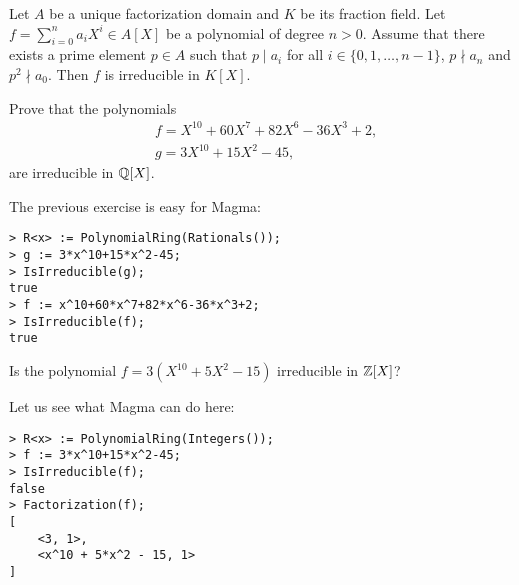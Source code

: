 \begin{bonus}
\label{bxca:Eisenstein's criterion}
    Let $A$ be a unique factorization domain and $K$ be its fraction field. 
    Let $f=\sum_{i=0}^n a_iX^i\in A[X]$ be a polynomial of degree $n>0$. 
    Assume that there exists a prime element $p\in A$ such that
    $p\mid a_i$ for all $i\in\{0,1,\dots,n-1\}$, $p\nmid a_n$ and
    $p^2\nmid a_0$. Then $f$ is irreducible in $K[X]$. 
\end{bonus}

\begin{exercise}
\label{xca: using Eisenstein}
    Prove that
    the polynomials 
    \begin{align*}
    &f=X^{10}+60X^7+82X^6-36X^3+2,\\
    &g=3X^{10}+15X^2-45, 
    \end{align*}
    are irreducible in $\mathbb{Q}[X]$. 
\end{exercise}

The previous exercise is easy for Magma:
\begin{lstlisting}
> R<x> := PolynomialRing(Rationals());
> g := 3*x^10+15*x^2-45;
> IsIrreducible(g);
true
> f := x^10+60*x^7+82*x^6-36*x^3+2;
> IsIrreducible(f);
true    
\end{lstlisting}

\begin{exercise}
\label{xca: counterexample os Eisenstein in Z}
    Is the polynomial $f=3(X^{10}+5X^2-15)$ irreducible in $\mathbb{Z}[X]$? 
\end{exercise}

Let us see what Magma can do here:
\begin{lstlisting}
> R<x> := PolynomialRing(Integers());
> f := 3*x^10+15*x^2-45;
> IsIrreducible(f);
false
> Factorization(f);
[
    <3, 1>,
    <x^10 + 5*x^2 - 15, 1>
]    
\end{lstlisting}


